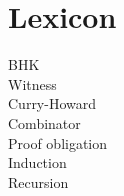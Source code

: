 \chapter{Lexicon}

\begin{description}
\item [BHK]
\item [Witness]
\item [Curry-Howard]
\item [Combinator] 
\item [Proof obligation]
\item [Induction] 
\item [Recursion] 
\end{description}

